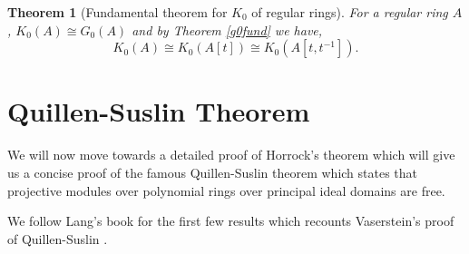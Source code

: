 \documentclass[12pt]{report}
\numberwithin{equation}{section}
\newcounter{dummy} \numberwithin{dummy}{section}
\newtheorem{theorem}[dummy]{Theorem}
\newtheorem{definition}[dummy]{Definition}
\begin{document}
	\begin{theorem}[Fundamental theorem for $K_0$ of regular rings]\label{extensionk0iscong}
		For a regular ring $A$, $K_0(A)\cong G_0(A)$ and by Theorem \ref{g0fund} we have, \[ K_0(A) \cong K_0(A[t]) \cong K_0(A[t,t^{-1}]) .\]
	\end{theorem}

	
%	
	
	
	\chapter{Quillen-Suslin Theorem}
	We will now move towards a detailed proof of Horrock's theorem which will give us a concise proof of the famous Quillen-Suslin theorem which states that projective modules over polynomial rings over principal ideal domains are free. 
	
	We follow Lang's book for the first few results which recounts Vaserstein's proof of Quillen-Suslin \cite{lang02}.
	
\end{document}
